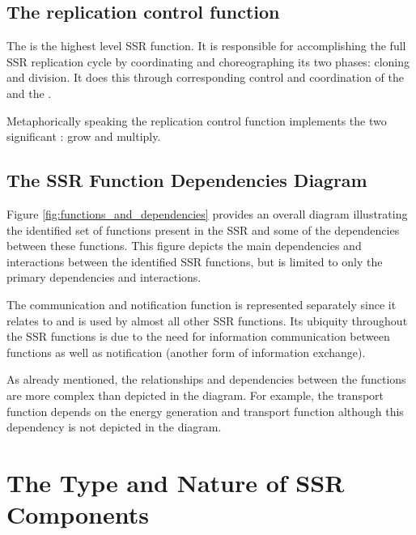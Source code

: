 \subsection{The replication control function}

The  is the highest level SSR function. It is responsible 
for
accomplishing the full SSR replication cycle by coordinating and
choreographing its two phases: cloning and division.  It does this through
corresponding control and coordination of the  
and the .

Metaphorically speaking the replication control function implements the
two significant : grow and multiply.

\subsection{The SSR Function Dependencies Diagram}

Figure \ref{fig:functions_and_dependencies}
provides an overall diagram illustrating
the identified set of functions present in the SSR and some of the
dependencies between these functions.  
This figure depicts the main dependencies and interactions between the identified SSR
functions, but is limited to only the primary dependencies and interactions.

The communication and notification function is represented separately
since it relates to and is used by almost all other SSR functions.
Its ubiquity throughout the SSR functions is due to the need for information communication between functions as
well as notification (another form of information exchange).

As already mentioned, the relationships and dependencies between the
functions are more complex than depicted in the diagram. For
example, the transport function depends on the energy generation and
transport function although this dependency is not depicted in the
diagram.


\section{The Type and Nature of SSR Components}

